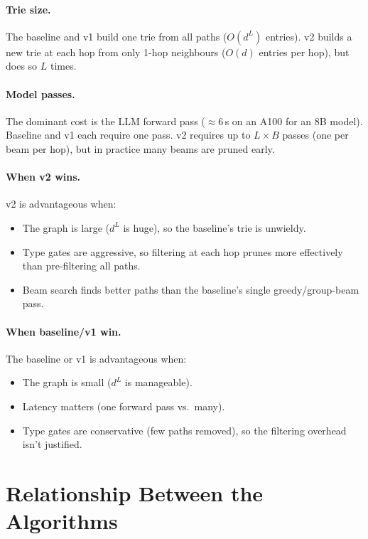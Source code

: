 \documentclass[11pt,a4paper]{article}
\begin{document}
\paragraph{Trie size.}
The baseline and v1 build one trie from all paths ($O(d^L)$ entries).
v2 builds a new trie at each hop from only 1-hop neighbours ($O(d)$
entries per hop), but does so $L$ times.

\paragraph{Model passes.}
The dominant cost is the LLM forward pass ($\approx$6\,s on an A100 for
an 8B model).  Baseline and v1 each require one pass.  v2 requires up
to $L \times B$ passes (one per beam per hop), but in practice many
beams are pruned early.

\paragraph{When v2 wins.}
v2 is advantageous when:
\begin{itemize}
  \item The graph is large ($d^L$ is huge), so the baseline's trie
    is unwieldy.
  \item Type gates are aggressive, so filtering at each hop prunes
    more effectively than pre-filtering all paths.
  \item Beam search finds better paths than the baseline's single
    greedy/group-beam pass.
\end{itemize}

\paragraph{When baseline/v1 win.}
The baseline or v1 is advantageous when:
\begin{itemize}
  \item The graph is small ($d^L$ is manageable).
  \item Latency matters (one forward pass vs.\ many).
  \item Type gates are conservative (few paths removed), so the
    filtering overhead isn't justified.
\end{itemize}

\section{Relationship Between the Algorithms}
\end{document}
